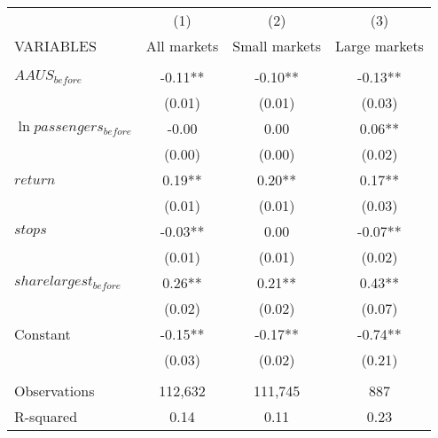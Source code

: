 \begin{tabular}{lccc} \hline
 & (1) & (2) & (3) \\
VARIABLES & All markets & Small markets & Large markets \\ \hline
 &  &  &  \\
$ AAUS_{before} $ & -0.11** & -0.10** & -0.13** \\
 & (0.01) & (0.01) & (0.03) \\
$ \ln passengers_{before} $ & -0.00 & 0.00 & 0.06** \\
 & (0.00) & (0.00) & (0.02) \\
$ return $ & 0.19** & 0.20** & 0.17** \\
 & (0.01) & (0.01) & (0.03) \\
$ stops $ & -0.03** & 0.00 & -0.07** \\
 & (0.01) & (0.01) & (0.02) \\
$ sharelargest_{before} $ & 0.26** & 0.21** & 0.43** \\
 & (0.02) & (0.02) & (0.07) \\
Constant & -0.15** & -0.17** & -0.74** \\
 & (0.03) & (0.02) & (0.21) \\
 &  &  &  \\
Observations & 112,632 & 111,745 & 887 \\
 R-squared & 0.14 & 0.11 & 0.23 \\ \hline
\end{tabular}
